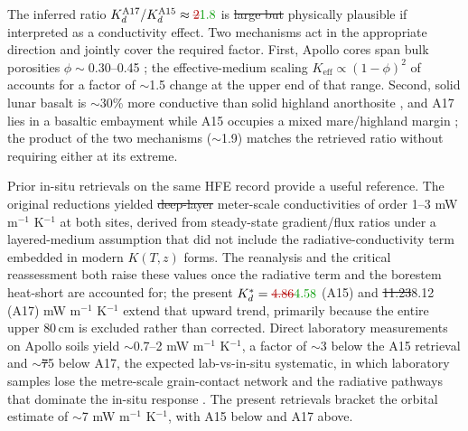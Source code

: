 \documentclass[11pt]{article}
\makeatletter
\newcommand{\zborestem}{80\,\si{\centi\meter}}
\let\sout@orig\sout
\renewcommand{\sout}[1]{\ifmmode\text{\sout@orig{\ensuremath{#1}}}\else\sout@orig{#1}\fi}
\newcommand{\new}[1]{\textcolor{green!60!black}{#1}}
\newcommand{\old}[1]{\textcolor{red!70!black}{\sout{#1}}}
\newcommand{\new}[1]{\textcolor{green!60!black}{#1}}
\newcommand{\old}[1]{}
\newcommand{\new}[1]{#1}
\newcommand{\old}[1]{}
\makeatother
\begin{document}
The inferred ratio
$K_d^{\mathrm{A17}}/K_d^{\mathrm{A15}}\approx \old{2}\new{1.8}$ is
\old{large but }physically plausible if interpreted as a conductivity
effect. Two
mechanisms act in the appropriate direction\new{ and jointly cover the
required factor}. First, Apollo cores span bulk
porosities $\phi\sim 0.30$--0.45 \citep{mitchell1973,carrier1991}; the
effective-medium scaling $K_\mathrm{eff}\propto(1-\phi)^2$ of
\citet{wood2020} accounts for a factor of $\sim$1.5 change at the upper end
of that range. Second, solid lunar basalt is $\sim$30\% more conductive
than solid highland anorthosite \citep{horai1972}, and A17 lies in a
basaltic embayment while A15 occupies a mixed mare/highland margin
\citep{korotev2005,wieczorek2006,crawford2015}\new{; the product of the
two mechanisms ($\sim$1.9) matches the retrieved ratio without
requiring either at its extreme}.

Prior in-situ retrievals on the same HFE record provide a useful reference.
The original \citet{langseth1972,langseth1976} reductions yielded
\old{deep-layer }\new{meter-scale }conductivities of order
1--3 mW m$^{-1}$ K$^{-1}$ at both sites, derived from steady-state
gradient/flux ratios under a layered-medium assumption that did not include
the radiative-conductivity term embedded in modern $K(T,z)$ forms. The
\citet{keihm1984} reanalysis and the \citet{grott2010} critical
reassessment both raise these values once the radiative term and the
borestem heat-short are accounted for; the present
$K_d^{*}=\old{4.86}\new{4.58}$ (A15) and
\old{11.23}\new{8.12} (A17) mW m$^{-1}$ K$^{-1}$ extend that upward trend,
primarily
because the entire upper $\zborestem$ is excluded rather than corrected.
Direct laboratory measurements on Apollo soils
\citep{cremers1971,horai1981,hemingway1973} yield
$\sim$0.7--2 mW m$^{-1}$ K$^{-1}$, a factor of $\sim$3 below the A15
retrieval and $\sim$\old{7}\new{5} below A17, the expected
lab-vs-in-situ systematic, in
which laboratory samples lose the metre-scale grain-contact network and the
radiative pathways that dominate the in-situ response
\citep{wood2020,feng2020}. The present retrievals bracket the orbital
\citet{vasavada2012} estimate of $\sim$7 mW m$^{-1}$ K$^{-1}$, with A15
below and A17 above.
\end{document}
